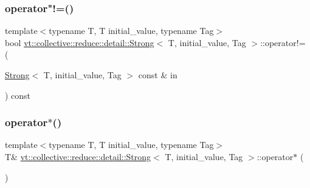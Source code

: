 \subsubsection{\texorpdfstring{operator"!=()}{operator!=()}}
{\footnotesize\ttfamily template$<$typename T, T initial\+\_\+value, typename Tag$>$ \\
bool \hyperlink{structvt_1_1collective_1_1reduce_1_1detail_1_1_strong}{vt\+::collective\+::reduce\+::detail\+::\+Strong}$<$ T, initial\+\_\+value, Tag $>$\+::operator!= (\begin{DoxyParamCaption}\item[{\hyperlink{structvt_1_1collective_1_1reduce_1_1detail_1_1_strong}{Strong}$<$ T, initial\+\_\+value, Tag $>$ const \&}]{in }\end{DoxyParamCaption}) const\hspace{0.3cm}{\ttfamily [inline]}}

\mbox{\label{structvt_1_1collective_1_1reduce_1_1detail_1_1_strong_ae4f668ef8de598177396f4dc575fce3c}} 
\subsubsection{\texorpdfstring{operator$\ast$()}{operator*()}\hspace{0.1cm}{\footnotesize\ttfamily [1/2]}}
{\footnotesize\ttfamily template$<$typename T, T initial\+\_\+value, typename Tag$>$ \\
T\& \hyperlink{structvt_1_1collective_1_1reduce_1_1detail_1_1_strong}{vt\+::collective\+::reduce\+::detail\+::\+Strong}$<$ T, initial\+\_\+value, Tag $>$\+::operator$\ast$ (\begin{DoxyParamCaption}{ }\end{DoxyParamCaption})\hspace{0.3cm}{\ttfamily [inline]}}

\mbox{\label{structvt_1_1collective_1_1reduce_1_1detail_1_1_strong_abddd678b81243106268873116676f135}} 
